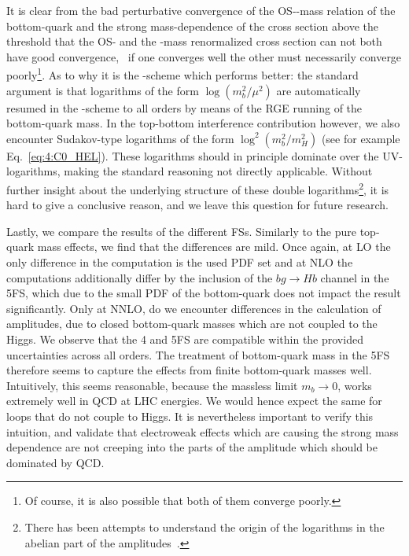 It is clear from the bad perturbative convergence of the \acs{OS}-\MS-mass relation of the bottom-quark and the strong mass-dependence of the cross section above the threshold that the \acs{OS}- and the \MS-mass renormalized cross section can not both have good convergence, \ie\ if one converges well the other must necessarily converge poorly\footnote{Of course, it is also possible that both of them converge poorly.}. As to why it is the \MS-scheme which performs better: the standard argument is that logarithms of the form $\log \left(m_b^2/\mu^2\right)$ are automatically resumed in the \MS-scheme to all orders by means of the \acs{RGE} running of the bottom-quark mass. In the top-bottom interference contribution however, we also encounter Sudakov-type logarithms of the form $\log^2 \left(m_b^2/m_H^2 \right)$ (see for example Eq.~\eqref{eq:4:C0_HEL}). These logarithms should in principle dominate over the \acs{UV}-logarithms, making the standard reasoning not directly applicable. Without further insight about the underlying structure of these double logarithms\footnote{There has been attempts to understand the origin of the logarithms in the abelian part of the amplitudes~\cite{Melnikov:2016emg}.}, it is hard to give a conclusive reason, and we leave this question for future research.

Lastly, we compare the results of the different \acs{FS}s. Similarly to the pure top-quark mass effects, we find that the differences are mild. Once again, at \acs{LO} the only difference in the computation is the used \acs{PDF} set and at \acs{NLO} the computations additionally differ by the inclusion of the $b g \longrightarrow Hb$ channel in the 5\acs{FS}, which due to the small \acs{PDF} of the bottom-quark does not impact the result significantly. Only at \acs{NNLO}, do we encounter differences in the calculation of amplitudes, due to closed bottom-quark masses which are not coupled to the Higgs. We observe that the 4 and 5\acs{FS} are compatible within the provided uncertainties across all orders. The treatment of bottom-quark mass in the 5\acs{FS} therefore seems to capture the effects from finite bottom-quark masses well. Intuitively, this seems reasonable, because the massless limit $m_b \rightarrow 0$, works extremely well in \acs{QCD} at \acs{LHC} energies. We would hence expect the same for loops that do not couple to Higgs. It is nevertheless important to verify this intuition, and validate that electroweak effects which are causing the strong mass dependence are not creeping into the parts of the amplitude which should be dominated by \acs{QCD}.



